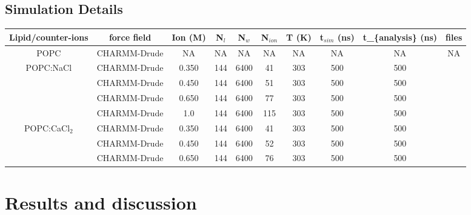 \documentclass[journal=jacsat,manuscript=article,layout=singlecolumn]{achemso}
\begin{document}
\subsection{Simulation Details}

\newpage
\begin{adjustbox}{angle=90}
\begin{tabular}{cccccccccc}
	Lipid/counter-ions                & force field  & Ion (M) & N$_{l}$ & N$_{w}$ & N$_{ion}$ & T (K) & t$_{sim}$ (ns) & t\_\{analysis\} (ns) & files \\ \hline
POPC                              & CHARMM-Drude & NA      & NA       & NA       & NA         & NA    & NA              & NA                   & NA    \\ \hline
	\multirow{4}{*}{POPC:NaCl}        & CHARMM-Drude & 0.350   & 144      & 6400     & 41         & 303   & 500             & 500                  & \cite{kav_batuhan_2020_4048180}   \\
				  & CHARMM-Drude & 0.450   & 144      & 6400     & 51         & 303   & 500             & 500                  & \cite{kav_batuhan_2020_4048171}   \\
				  & CHARMM-Drude & 0.650   & 144      & 6400     & 77         & 303   & 500             & 500                  & \cite{kav_batuhan_2020_4074903}   \\
				  & CHARMM-Drude & 1.0     & 144      & 6400     & 115        & 303   & 500             & 500                  & \cite{kav_batuhan_2020_4074906}   \\ \hline
	\multirow{3}{*}{POPC:CaCl$_{2}$} & CHARMM-Drude & 0.350   & 144      & 6400     & 41         & 303   & 500             & 500                  & \cite{kav_batuhan_2020_4048178}   \\
				  & CHARMM-Drude & 0.450   & 144      & 6400     & 52         & 303   & 500             & 500                  & \cite{kav_batuhan_2020_4048172}   \\
				  & CHARMM-Drude & 0.650   & 144      & 6400     & 76         & 303   & 500             & 500                  & \cite{kav_batuhan_2020_4048175}
\end{tabular}
\end{adjustbox}

\section{Results and discussion}
\end{document}
